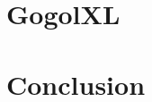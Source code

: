 \documentclass[a4paper, 11pt]{article}
\begin{document}
\section*{GogolXL}


\section*{Conclusion}



\begin{thebibliography}{9}
\end{thebibliography}
\end{document}
